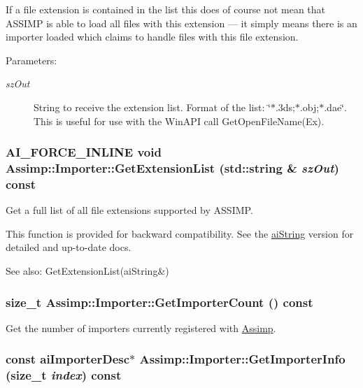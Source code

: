 If a file extension is contained in the list this does of course not mean that ASSIMP is able to load all files with this extension --- it simply means there is an importer loaded which claims to handle files with this file extension. \begin{Desc}
\item[Parameters:]
\begin{description}
\item[{\em szOut}]String to receive the extension list. Format of the list: \char`\"{}$\ast$.3ds;$\ast$.obj;$\ast$.dae\char`\"{}. This is useful for use with the WinAPI call GetOpenFileName(Ex). \end{description}
\end{Desc}
\hypertarget{class_assimp_1_1_importer_6ab684351c55e170de3c5b7d730b306d}{
\subsubsection[GetExtensionList]{\setlength{\rightskip}{0pt plus 5cm}AI\_\-FORCE\_\-INLINE void Assimp::Importer::GetExtensionList (std::string \& {\em szOut}) const}}
\label{class_assimp_1_1_importer_6ab684351c55e170de3c5b7d730b306d}


Get a full list of all file extensions supported by ASSIMP. 

This function is provided for backward compatibility. See the \hyperlink{structai_string}{aiString} version for detailed and up-to-date docs. \begin{Desc}
\item[See also:]GetExtensionList(aiString\&) \end{Desc}
\hypertarget{class_assimp_1_1_importer_fe982451f1a1c9b0b59c788f9329ccc1}{
\subsubsection[GetImporterCount]{\setlength{\rightskip}{0pt plus 5cm}size\_\-t Assimp::Importer::GetImporterCount () const}}
\label{class_assimp_1_1_importer_fe982451f1a1c9b0b59c788f9329ccc1}


Get the number of importers currently registered with \hyperlink{namespace_assimp}{Assimp}. \hypertarget{class_assimp_1_1_importer_857dd22e071521c7747dc909f6a8f6f9}{
\subsubsection[GetImporterInfo]{\setlength{\rightskip}{0pt plus 5cm}const {\bf aiImporterDesc}$\ast$ Assimp::Importer::GetImporterInfo (size\_\-t {\em index}) const}}
\label{class_assimp_1_1_importer_857dd22e071521c7747dc909f6a8f6f9}


